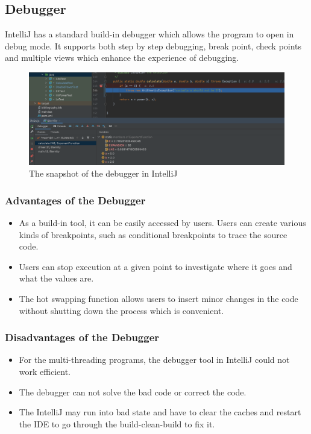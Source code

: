 \documentclass[11pt]{article}
\begin{document}
\subsection{Debugger}
IntelliJ has a standard build-in debugger which allows the program to open in debug mode. It supports both step by step debugging, break point, check points and multiple views which enhance the experience of debugging.

\begin{figure}[h]
    \centering
    \includegraphics[width=15cm]{images/debugger.png}
    \caption{The snapshot of the debugger in IntelliJ}
    \label{fig:debugger}
\end{figure}

\subsubsection{Advantages of the Debugger}
\begin{center}
    \begin{itemize}
        \item As a build-in tool, it can be easily accessed by users. Users can create various kinds of breakpoints, such as conditional breakpoints to trace the source code.
        \item Users can stop execution at a given point to investigate where it goes and what the values are.
        \item The hot swapping function allows users to insert minor changes in the code without shutting down the process which is convenient.\cite{Anu:StackExchange}
    \end{itemize}
\end{center}

\subsubsection{Disadvantages of the Debugger}
\begin{center}
    \begin{itemize}
        \item For the multi-threading programs, the debugger tool in IntelliJ could not work efficient.
        \item The debugger can not solve the bad code or correct the code.
        \item The IntelliJ may run into bad state and have to clear the caches and restart the IDE to go through the build-clean-build to fix it.
    \end{itemize}
\end{center}
\end{document}
